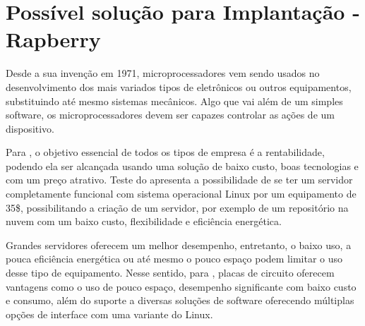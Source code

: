 \section{Possível solução para Implantação - Rapberry}
Desde a sua invenção em 1971, microprocessadores vem sendo usados no desenvolvimento dos mais variados tipos de eletrônicos ou outros equipamentos, substituindo até mesmo sistemas mecânicos. Algo que vai além de um simples software, os microprocessadores devem ser capazes controlar as ações de um dispositivo. \cite{rosenstark2007}

Para \cite{aristotelous2016}, o objetivo essencial de todos os tipos de empresa é a rentabilidade, podendo ela ser alcançada usando uma solução de baixo custo, boas tecnologias e com um preço atrativo. Teste do \cite{aristotelous2016} apresenta a possibilidade de se ter um servidor completamente funcional com sistema operacional Linux por um equipamento de 35\$, possibilitando a criação de um servidor, por exemplo de um repositório na nuvem com um baixo custo, flexibilidade e eficiência energética. 

Grandes servidores oferecem um melhor desempenho, entretanto, o baixo uso, a pouca eficiência energética ou até mesmo o pouco espaço podem limitar o uso desse tipo de equipamento. Nesse sentido, para \cite{cusick2014}, placas de circuito oferecem vantagens como o uso de pouco espaço, desempenho significante com baixo custo e consumo, além do suporte a diversas soluções de software oferecendo múltiplas opções de interface com uma variante do Linux. 
